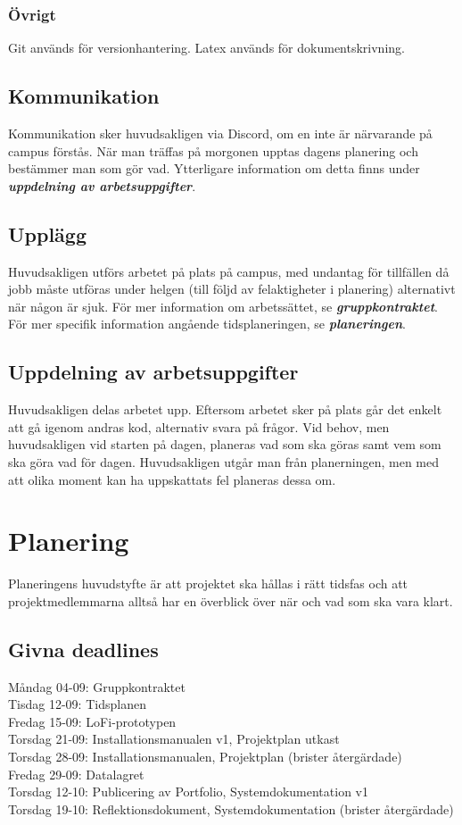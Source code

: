 \documentclass{TDP003mall}
\begin{document}
\subsubsection{Övrigt}
Git används för versionhantering. Latex används för dokumentskrivning. 

\subsection{Kommunikation}
Kommunikation sker huvudsakligen via Discord, om en inte är närvarande på campus förstås. När man träffas på morgonen upptas dagens 
planering och bestämmer man som gör vad. Ytterligare information om detta finns under \textbf{\textit{uppdelning av arbetsuppgifter}}.

\subsection{Upplägg}
Huvudsakligen utförs arbetet på plats på campus, med undantag för tillfällen då jobb måste utföras under helgen (till följd av felaktigheter i planering)
alternativt när någon är sjuk. För mer information om arbetssättet, se \textbf{\textit{gruppkontraktet}}. För mer specifik information angående tidsplaneringen, 
se \textbf{\textit{planeringen}}. 

\subsection{Uppdelning av arbetsuppgifter}
Huvudsakligen delas arbetet upp. Eftersom arbetet sker på plats går det enkelt att gå igenom andras kod, alternativ svara på frågor. 
Vid behov, men huvudsakligen vid starten på dagen, planeras vad som ska göras samt vem som ska göra vad för dagen. Huvudsakligen utgår man från
planerningen, men med att olika moment kan ha uppskattats fel planeras dessa om. 

\section{Planering}
Planeringens huvudstyfte är att projektet ska hållas i rätt tidsfas och att projektmedlemmarna alltså har en överblick över när och vad som ska vara klart.
\subsection{Givna deadlines}
Måndag 04-09: Gruppkontraktet\\
Tisdag 12-09: Tidsplanen\\
Fredag 15-09: LoFi-prototypen\\
Torsdag 21-09: Installationsmanualen v1, Projektplan utkast\\
Torsdag 28-09: Installationsmanualen, Projektplan (brister återgärdade)\\
Fredag 29-09: Datalagret\\
Torsdag 12-10: Publicering av Portfolio, Systemdokumentation v1\\
Torsdag 19-10: Reflektionsdokument, Systemdokumentation (brister återgärdade)\\
\end{document}
